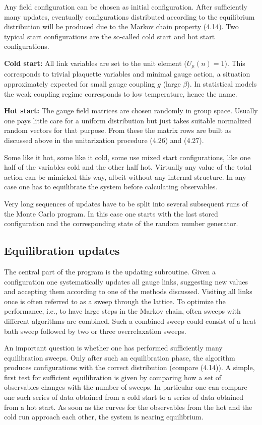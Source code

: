Any field configuration can be chosen as initial configuration. After sufficiently
many updates, eventually configurations distributed according to the equilibrium distribution will be produced due to the Markov chain property (4.14).
Two typical start configurations are the so-called cold start and hot start configurations.

\textbf{Cold start:} All link variables are set to the unit element ($U_\mu(n) = 1$).
This corresponds to trivial plaquette variables and minimal gauge action, a
situation approximately expected for small gauge coupling $g$ (large $\beta$). In
statistical models the weak coupling regime corresponds to low temperature,
hence the name.

\textbf{Hot start:} The gauge field matrices are chosen randomly in group space.
Usually one pays little care for a uniform distribution but just takes suitable
normalized random vectors for that purpose. From these the matrix rows are
built as discussed above in the unitarization procedure (4.26) and (4.27).

Some like it hot, some like it cold, some use mixed start configurations, like
one half of the variables cold and the other half hot. Virtually any value of the
total action can be mimicked this way, albeit without any internal structure.
In any case one has to equilibrate the system before calculating observables.

Very long sequences of updates have to be split into several subsequent
runs of the Monte Carlo program. In this case one starts with the last stored
configuration and the corresponding state of the random number generator.

\subsection{Equilibration updates}

The central part of the program is the updating subroutine. Given a configuration one systematically updates all gauge links, suggesting new values
and accepting them according to one of the methods discussed. Visiting all
links once is often referred to as a sweep through the lattice. To optimize the
performance, i.e., to have large steps in the Markov chain, often sweeps with
different algorithms are combined. Such a combined sweep could consist of a
heat bath sweep followed by two or three overrelaxation sweeps.

An important question is whether one has performed sufficiently many
equilibration sweeps. Only after such an equilibration phase, the algorithm
produces configurations with the correct distribution (compare (4.14)). A simple, first test for sufficient equilibration is given by comparing how a set of
observables changes with the number of sweeps. In particular one can compare
one such series of data obtained from a cold start to a series of data obtained
from a hot start. As soon as the curves for the observables from the hot and
the cold run approach each other, the system is nearing equilibrium.

